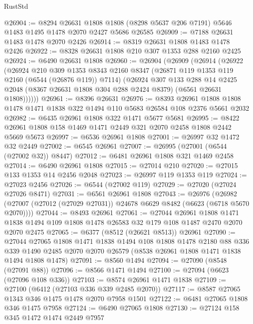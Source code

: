 \begin{lexlean}{RustStd}
\begin{coremodule}
@26904 := @8294
    @26631
    @1808
    @1808
    (@8298 @5637 @206 @7191)
    @5646
    @1483
    @1495
    @1478
    @2070
    @2427
    @5686
    @26585
@26909 := @7188 @26631 @1483 @1478 @2070 @2426
@26914 := @8319 @26631 @1808 @1483 @1478 @2426
@26922 := @8328 @26631 @1808 @210 @307 @1353 @288 @2160 @2425
@26924 := @6490 @26631 @1808
@26960 := @26904
    (@26909
      (@26914
        (@26922
          (@26924
            @210
            @309
            @1353
            @8343
            @2160
            @8347
            (@26871 @119 @1353 @119 @2160 (@6544 (@26876 @119)) @7114)
            (@26924
              @307
              @133
              @288
              @14
              @2425
              @2048
              (@8367 @26631 @1808 @304 @288 @2424 @8379)
              (@6561 @26631 @1808))))))
@26961 := @8396 @26631
@26976 := @8393
    @26961
    @1808
    @1808
    @1478
    @1471
    @1838
    @322
    @1494
    @110
    @5683
    @26584
    @108
    @2376
    @5661
    @2032
@26982 := @6435 @26961 @1808 @322 @1471 @5677 @5681
@26995 := @8422 @26961 @1808 @158 @1469 @1471 @2449 @321 @2070 @2458 @1808 @2442 @5669 @5673
@26997 := @6536 @26961 @1808
@27001 := @26997 @32 @1472 @32 @2449
@27002 := @6545 @26961
@27007 := @26995 (@27001 (@6544 (@27002 @32)) @8447)
@27012 := @6481 @26961 @1808 @321 @1469 @2458
@27014 := @6490 @26961 @1808
@27015 := @27014 @210
@27020 := @27015 @133 @1353 @14 @2456 @2048
@27023 := @26997 @119 @1353 @119
@27024 := @27023 @2456
@27026 := @6544 (@27002 @119)
@27029 := @27020 (@27024 @27026 @8471)
@27031 := @6561 @26961 @1808
@27043 := @26976
    (@26982 (@27007 (@27012 (@27029 @27031)) @24678 @6629 @8482 (@6623 (@6718 @5670 @2070))))
@27044 := @8493 @26961
@27061 := @27044
    @26961
    @1808
    @1471
    @1838
    @1494
    @109
    @1808
    @1478
    @26583
    @32
    @179
    @108
    @1487
    @2470
    @2070
    @2070
    @2475
@27065 := @6377 (@8512 (@26621 @8513)) @26961
@27090 := @27044
    @27065
    @1808
    @1471
    @1838
    @1494
    @108
    @1808
    @1478
    @2180
    @88
    @336
    @339
    @1490
    @2485
    @2070
    @2070
    @26579
    (@8538 @26961 @1808 @1471 @1838 @1494 @1808 @1478)
@27091 := @8560 @1494
@27094 := @27090 (@8548 (@27091 @88))
@27096 := @8566 @1471 @1494
@27100 := @27094 (@6623 (@27096 @108 @336))
@27103 := @8574 @26961 @1471 @1838
@27109 := @27100 (@6412 (@27103 @336 @339 @2485 @2070))
@27117 := @8587 @27065 @1343 @346 @1475 @1478 @2070 @7958 @1501
@27122 := @6481 @27065 @1808 @346 @1475 @7958
@27124 := @6490 @27065 @1808
@27130 := @27124 @158 @345 @1472 @1474 @2449 @7957

\end{coremodule}
\end{lexlean}
